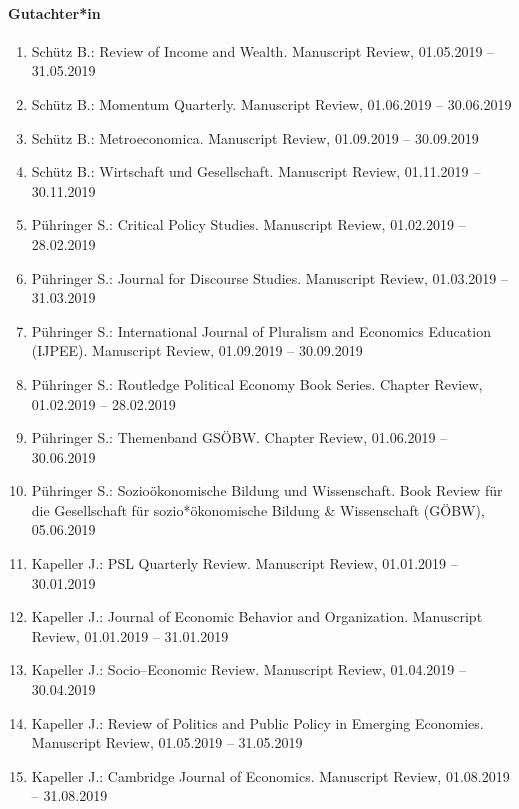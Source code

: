 \paragraph{Gutachter*in}
\begin{enumerate}[leftmargin=*, labelsep=0.5cm]
\item Schütz B.: Review of Income and Wealth. Manuscript Review, 01.05.2019 -- 31.05.2019
\item Schütz B.: Momentum Quarterly. Manuscript Review, 01.06.2019 -- 30.06.2019
\item Schütz B.: Metroeconomica. Manuscript Review, 01.09.2019 -- 30.09.2019
\item Schütz B.: Wirtschaft und Gesellschaft. Manuscript Review, 01.11.2019 -- 30.11.2019
\item Pühringer S.: Critical Policy Studies. Manuscript Review, 01.02.2019 -- 28.02.2019
\item Pühringer S.: Journal for Discourse Studies. Manuscript Review, 01.03.2019 -- 31.03.2019
\item Pühringer S.: International Journal of Pluralism and Economics Education (IJPEE). Manuscript Review, 01.09.2019 -- 30.09.2019
\item Pühringer S.: Routledge Political Economy Book Series. Chapter Review, 01.02.2019 -- 28.02.2019
\item Pühringer S.: Themenband GSÖBW. Chapter Review, 01.06.2019 -- 30.06.2019
\item Pühringer S.: Sozioökonomische Bildung und Wissenschaft. Book Review für die Gesellschaft für sozio*ökonomische Bildung \& Wissenschaft (GÖBW), 05.06.2019
\item Kapeller J.: PSL Quarterly Review. Manuscript Review, 01.01.2019 -- 30.01.2019
\item Kapeller J.: Journal of Economic Behavior and Organization. Manuscript Review, 01.01.2019 -- 31.01.2019
\item Kapeller J.: Socio--Economic Review. Manuscript Review, 01.04.2019 -- 30.04.2019
\item Kapeller J.: Review of Politics and Public Policy in Emerging Economies. Manuscript Review, 01.05.2019 -- 31.05.2019
\item Kapeller J.: Cambridge Journal of Economics. Manuscript Review, 01.08.2019 -- 31.08.2019
\end{enumerate}

